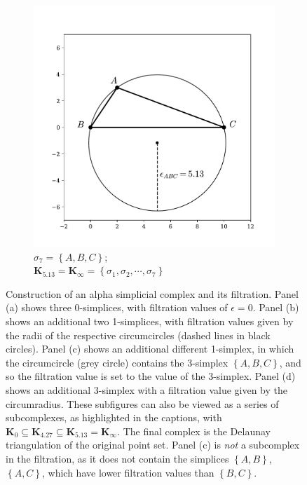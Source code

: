 \begin{figure}[tb]
\begin{subfigure}[b]{0.45\textwidth}
         \includegraphics[width=\textwidth]{./figures/ph/alpha_c.pdf}
         \caption{$\sigma_7=\left\{A,B,C\right\}$; \\ $\mathbf{K}_{5.13}=\mathbf{K}_{\infty} = \left\{\sigma_1,\sigma_2,\cdots,\sigma_7\right\}$}
         \label{fig:phalphac}
     \end{subfigure}
     \hfill
    
	\caption{Construction of an alpha simplicial complex and its filtration. Panel (a) shows three 0\--simplices, with filtration values of $\epsilon=0$. Panel (b) shows an additional two 1\--simplices, with filtration values given by the radii of the respective circumcircles (dashed lines in black circles). Panel (c) shows an additional different 1\--simplex, in which the circumcircle (grey circle) contains the 3\--simplex $\left\{A,B,C\right\}$, and so the filtration value is set to the value of the 3\--simplex. Panel (d) shows an additional 3\--simplex with a filtration value given by the circumradius.
	These subfigures can also be viewed as a series of subcomplexes, as highlighted in the captions, with $\mathbf{K}_0\subseteq\mathbf{K}_{4.27}\subseteq\mathbf{K}_{5.13}=\mathbf{K}_\infty$. The final complex is the Delaunay triangulation of the original point set. Panel (c) is \textit{not} a subcomplex in the filtration, as it does not contain the simplices $\left\{A,B\right\}$, $\left\{A,C\right\}$, which have lower filtration values than $\left\{B,C\right\}$. }
	\label{fig:phalpha}
\end{figure}

